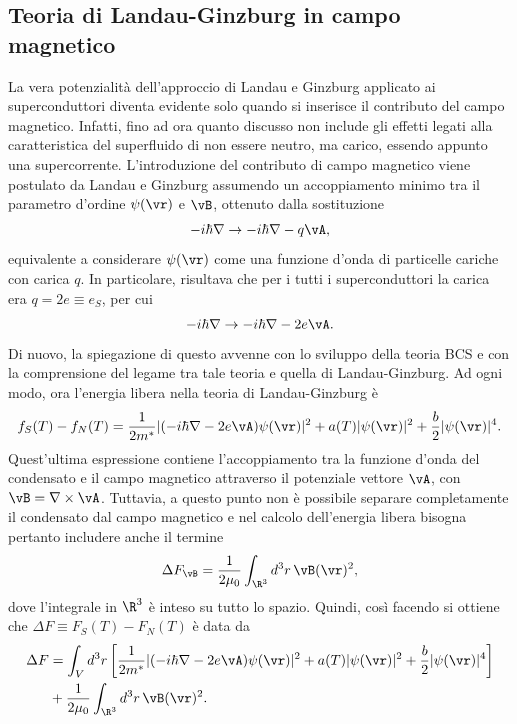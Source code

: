 \subsection{Teoria di Landau-Ginzburg in campo magnetico}
La vera potenzialità dell'approccio di Landau e Ginzburg applicato ai superconduttori diventa evidente solo quando si inserisce il contributo del campo magnetico. Infatti, fino ad ora quanto discusso non include gli effetti legati alla caratteristica del superfluido di non essere neutro, ma carico, essendo appunto una supercorrente. L'introduzione del contributo di campo magnetico viene postulato da Landau e Ginzburg assumendo un accoppiamento minimo tra il parametro d'ordine $\psi(\vr)$ e $\vB$, ottenuto dalla sostituzione
\begin{equation}
    -i\hbar\nabla \to -i\hbar\nabla - q\vA,
\end{equation}
equivalente a considerare $\psi(\vr)$ come una funzione d'onda di particelle cariche con carica $q$. In particolare, risultava che per i tutti i superconduttori la carica era $q = 2e \equiv e_S$, per cui
\begin{equation}
    -i\hbar\nabla \to -i\hbar\nabla - 2e\vA.
\end{equation}
Di nuovo, la spiegazione di questo avvenne con lo sviluppo della teoria BCS e con la comprensione del legame tra tale teoria e quella di Landau-Ginzburg. Ad ogni modo, ora l'energia libera nella teoria di Landau-Ginzburg è
\begin{equation}
    f_S(T) - f_N(T) = \frac{1}{2m^*}|(-i\hbar\nabla - 2e\vA)\psi(\vr)|^2 + a(T)|\psi(\vr)|^2 + \frac{b}{2}|\psi(\vr)|^4.
\end{equation}
Quest'ultima espressione contiene l'accoppiamento tra la funzione d'onda del condensato e il campo magnetico attraverso il potenziale vettore $\vA$, con $\vB = \nabla \times \vA$. Tuttavia, a questo punto non è possibile separare completamente il condensato dal campo magnetico e nel calcolo dell'energia libera bisogna pertanto includere anche il termine 
\begin{equation}
    \Delta F_{\vB} = \frac{1}{2\mu_0}\int_{\R^3} d^3r\,\vB(\vr)^2,
\end{equation}
dove l'integrale in $\R^3$ è inteso su tutto lo spazio. Quindi, così facendo si ottiene che $\Delta F \equiv F_S(T) - F_N(T)$ è data da
\begin{equation}
    \begin{split}
        \Delta F &= \int_V d^3r\,\bigg[\frac{1}{2m^*}|(-i\hbar\nabla - 2e\vA)\psi(\vr)|^2 + a(T)|\psi(\vr)|^2 + \frac{b}{2}|\psi(\vr)|^4\bigg] \\
        &+ \frac{1}{2\mu_0}\int_{\R^3} d^3r\,\vB(\vr)^2.
    \end{split}
\end{equation}

